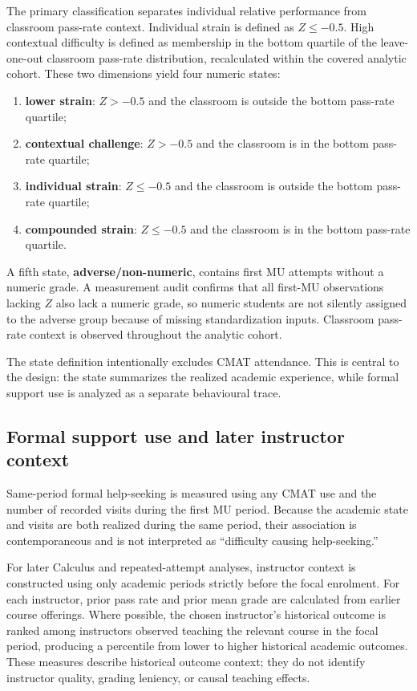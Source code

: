 The primary classification separates individual relative performance from classroom pass-rate context. Individual strain is defined as $Z\leq -0.5$. High contextual difficulty is defined as membership in the bottom quartile of the leave-one-out classroom pass-rate distribution, recalculated within the covered analytic cohort. These two dimensions yield four numeric states:
\begin{enumerate}
    \item \textbf{lower strain}: $Z>-0.5$ and the classroom is outside the bottom pass-rate quartile;
    \item \textbf{contextual challenge}: $Z>-0.5$ and the classroom is in the bottom pass-rate quartile;
    \item \textbf{individual strain}: $Z\leq-0.5$ and the classroom is outside the bottom pass-rate quartile;
    \item \textbf{compounded strain}: $Z\leq-0.5$ and the classroom is in the bottom pass-rate quartile.
\end{enumerate}
A fifth state, \textbf{adverse/non-numeric}, contains first MU attempts without a numeric grade. A measurement audit confirms that all first-MU observations lacking $Z$ also lack a numeric grade, so numeric students are not silently assigned to the adverse group because of missing standardization inputs. Classroom pass-rate context is observed throughout the analytic cohort.

The state definition intentionally excludes CMAT attendance. This is central to the design: the state summarizes the realized academic experience, while formal support use is analyzed as a separate behavioural trace.

\subsection{Formal support use and later instructor context}

Same-period formal help-seeking is measured using any CMAT use and the number of recorded visits during the first MU period. Because the academic state and visits are both realized during the same period, their association is contemporaneous and is not interpreted as ``difficulty causing help-seeking.''

For later Calculus and repeated-attempt analyses, instructor context is constructed using only academic periods strictly before the focal enrolment. For each instructor, prior pass rate and prior mean grade are calculated from earlier course offerings. Where possible, the chosen instructor's historical outcome is ranked among instructors observed teaching the relevant course in the focal period, producing a percentile from lower to higher historical academic outcomes. These measures describe historical outcome context; they do not identify instructor quality, grading leniency, or causal teaching effects.

